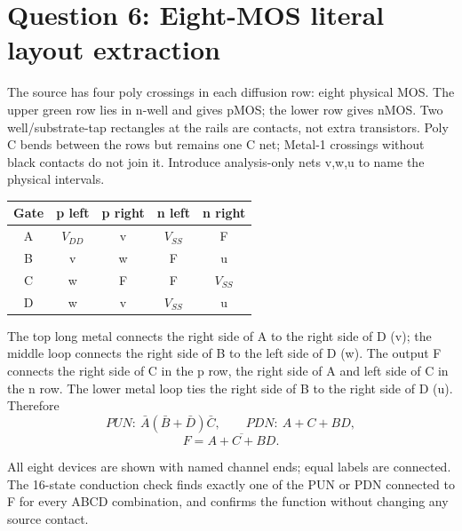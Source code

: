 \documentclass[10pt]{article}
\newcommand{\mos}[4]{\begin{scope}[shift={(#1,#2)}]
\draw(0,.24)--(0,-.24);\draw(0,.2)--(.25,.2)--(.25,.5);\draw(0,-.2)--(.25,-.2)--(.25,-.5);
\draw(-.16,.23)--(-.16,-.23);
\ifnum#4=1\draw(-.26,0)circle(.06);\draw(-.75,0)--(-.32,0);\else\draw(-.75,0)--(-.16,0);\fi
\node[anchor=east,font=\scriptsize]at(-.76,0){$#3$};\end{scope}}
\begin{document}
\section*{Question 6: Eight-MOS literal layout extraction}
The source has four poly crossings in each diffusion row: eight physical MOS. The upper green row lies in n-well and gives pMOS; the lower row gives nMOS. Two well/substrate-tap rectangles at the rails are contacts, not extra transistors. Poly C bends between the rows but remains one C net; Metal-1 crossings without black contacts do not join it. Introduce analysis-only nets v,w,u to name the physical intervals.
\begin{center}\begin{tabular}{c|cc|cc}\toprule
Gate&p left&p right&n left&n right\\\midrule
A&$V_{DD}$&v&$V_{SS}$&F\\B&v&w&F&u\\C&w&F&F&$V_{SS}$\\D&w&v&$V_{SS}$&u\\\bottomrule
\end{tabular}\end{center}
The top long metal connects the right side of A to the right side of D (v); the middle loop connects the right side of B to the left side of D (w). The output F connects the right side of C in the p row, the right side of A and left side of C in the n row. The lower metal loop ties the right side of B to the right side of D (u). Therefore
\[PUN:\ \bar A(\bar B+\bar D)\bar C,\qquad PDN:\ A+C+BD,\]
\[\boxed{F=\overline{A+C+BD}.}\]
\begin{center}\end{center}
All eight devices are shown with named channel ends; equal labels are connected. The 16-state conduction check finds exactly one of the PUN or PDN connected to F for every ABCD combination, and confirms the function without changing any source contact.
\end{document}
